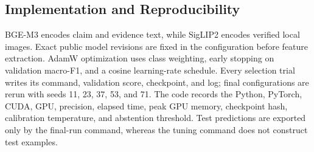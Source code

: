 

\subsection{Implementation and Reproducibility}

BGE-M3 encodes claim and evidence text, while SigLIP2 encodes verified local images. Exact public model revisions are fixed in the configuration before feature extraction. AdamW optimization uses class weighting, early stopping on validation macro-F1, and a cosine learning-rate schedule. Every selection trial writes its command, validation score, checkpoint, and log; final configurations are rerun with seeds 11, 23, 37, 53, and 71. The code records the Python, PyTorch, CUDA, GPU, precision, elapsed time, peak GPU memory, checkpoint hash, calibration temperature, and abstention threshold. Test predictions are exported only by the final-run command, whereas the tuning command does not construct test examples.

